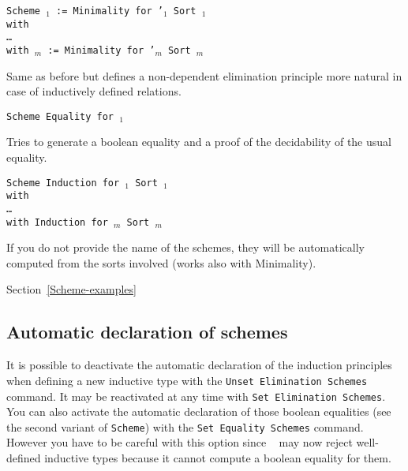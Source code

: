 \begin{Variants}
\item {\tt Scheme {\ident$_1$} := Minimality for \ident'$_1$ Sort {\sort$_1$} \\
    with\\
    \mbox{}\hspace{0.1cm} \dots\ \\
    with {\ident$_m$} := Minimality for {\ident'$_m$} Sort
    {\sort$_m$}}

  Same as before but defines a non-dependent elimination principle more
  natural in case of inductively defined relations. 

\item {\tt Scheme Equality for \ident$_1$}

  Tries to generate a boolean equality and a proof of the
  decidability of the usual equality.

\item {\tt Scheme Induction for \ident$_1$ Sort {\sort$_1$} \\
  with\\
  \mbox{}\hspace{0.1cm} \dots\\
        with Induction for {\ident$_m$} Sort
        {\sort$_m$}}

  If you do not provide the name of the schemes, they will be automatically 
  computed from the sorts involved (works also with Minimality).

\end{Variants}

\SeeAlso Section~\ref{Scheme-examples}

\subsection{Automatic declaration of schemes}
It is possible to deactivate the automatic declaration of the induction
 principles when defining a new inductive type  with the
 {\tt Unset Elimination Schemes} command. It may be
reactivated at any time with {\tt Set Elimination Schemes}. 
\\

You can also activate the automatic declaration of those boolean equalities 
(see the second variant of {\tt Scheme})  with the {\tt Set Equality Schemes}
 command. However you have to be careful with this option since
\Coq~ may now reject well-defined inductive types because it cannot compute
a boolean equality for them.

